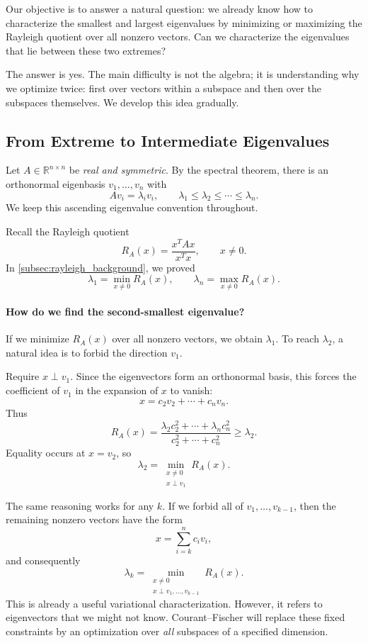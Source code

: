 \documentclass[14pt,letterpaper]{article}
\theoremstyle{plain}
\theoremstyle{definition}
\theoremstyle{remark}
\newcommand{\R}{\mathbb{R}}
\begin{document}
Our objective is to answer a natural question: we already
know how to characterize the smallest and largest eigenvalues
by minimizing or maximizing the Rayleigh quotient over all
nonzero vectors. Can we characterize the eigenvalues that
lie between these two extremes?

The answer is yes. The main difficulty is not the algebra;
it is understanding why we optimize twice: first over
vectors within a subspace and then over the subspaces
themselves. We develop this idea gradually.

\subsection{From Extreme to Intermediate Eigenvalues}
\label{subsec:courant_motivation}

Let $A\in\R^{n\times n}$ be \emph{real and symmetric}.
By the spectral theorem, there is an orthonormal eigenbasis
$v_1,\ldots,v_n$ with
\[
Av_i=\lambda_i v_i,\qquad
\lambda_1\leq\lambda_2\leq\cdots\leq\lambda_n.
\]
We keep this ascending eigenvalue convention throughout.

Recall the Rayleigh quotient
\[
R_A(x)=\frac{x^TAx}{x^Tx},\qquad x\neq0.
\]
In \cref{subsec:rayleigh_background}, we proved
\[
\boxed{
\lambda_1=\min_{x\neq0}R_A(x),\qquad
\lambda_n=\max_{x\neq0}R_A(x).
}
\]

\paragraph{How do we find the second-smallest eigenvalue?}
If we minimize $R_A(x)$ over all nonzero vectors, we
obtain $\lambda_1$. To reach $\lambda_2$, a natural
idea is to forbid the direction $v_1$.

Require $x\perp v_1$. Since the eigenvectors form an
orthonormal basis, this forces the coefficient of $v_1$
in the expansion of $x$ to vanish:
\[
x=c_2v_2+\cdots+c_nv_n.
\]
Thus
\[
R_A(x)=
\frac{\lambda_2c_2^2+\cdots+\lambda_nc_n^2}
     {c_2^2+\cdots+c_n^2}\geq\lambda_2.
\]
Equality occurs at $x=v_2$, so
\[
\boxed{
\lambda_2=
\min_{\substack{x\neq0\\x\perp v_1}}R_A(x).
}
\]

The same reasoning works for any $k$. If we forbid all
of $v_1,\ldots,v_{k-1}$, then the remaining nonzero
vectors have the form
\[
x=\sum_{i=k}^n c_i v_i,
\]
and consequently
\[
\boxed{
\lambda_k=
\min_{\substack{x\neq0\\
x\perp v_1,\ldots,v_{k-1}}}R_A(x).
}
\]
This is already a useful variational characterization.
However, it refers to eigenvectors that we might not
know. Courant--Fischer will replace these fixed
constraints by an optimization over \emph{all}
subspaces of a specified dimension.
\end{document}
